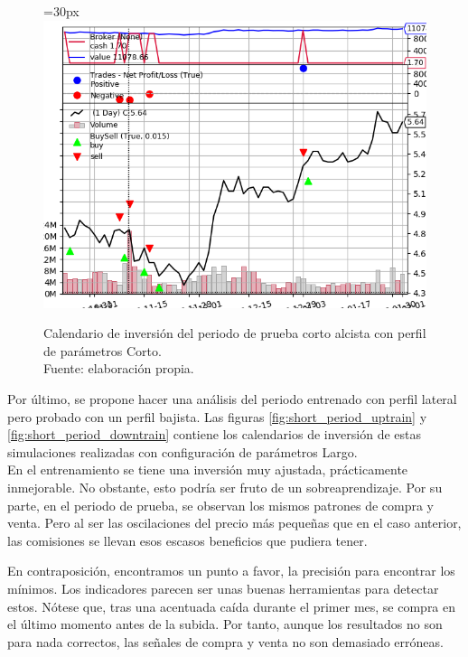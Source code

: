      	\begin{figure}[H]
     		\centering\leftskip=30px
     		\includegraphics[scale=0.70]{imagenes/S_Short_test.png}
     		\caption[Calendario de inversi\'on del periodo de prueba corto alcista]{Calendario de inversi\'on del periodo de prueba corto alcista con perfil de par\'ametros Corto.\\ Fuente: elaboraci\'on propia.}
     		\label{fig:short_period_uptest}
     	\end{figure} 
     	
Por \'ultimo, se propone hacer una an\'alisis del periodo entrenado con perfil lateral pero probado con un perfil bajista. Las figuras \ref{fig:short_period_uptrain} y \ref{fig:short_period_downtrain} contiene los calendarios de inversi\'on de estas simulaciones realizadas con configuraci\'on de par\'ametros Largo.\\

En el entrenamiento se tiene una inversi\'on muy ajustada, pr\'acticamente inmejorable. No obstante, esto podr\'ia ser fruto de un sobreaprendizaje. Por su parte, en el periodo de prueba, se observan los mismos patrones de compra y venta. Pero al ser las oscilaciones del precio m\'as peque\~nas que en el caso anterior, las comisiones se llevan esos escasos beneficios que pudiera tener.

En contraposici\'on, encontramos un punto a favor, la precisi\'on para encontrar los m\'inimos. Los indicadores parecen ser unas buenas herramientas para detectar estos. N\'otese que, tras una acentuada ca\'ida durante el primer mes, se compra en el \'ultimo momento antes de la subida. Por tanto, aunque los resultados no son para nada correctos, las se\~nales de compra y venta no son demasiado err\'oneas. 
     	
